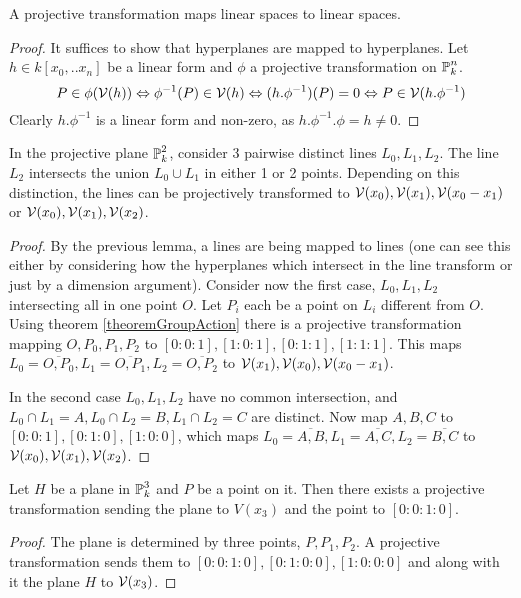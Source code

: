 \begin{lemma} \label{lemmaTransformOfLinearSpaces}
A projective transformation maps linear spaces to linear spaces.
\end{lemma}
\begin{proof}
It suffices to show that hyperplanes are mapped to hyperplanes.
Let $h \in k[x_0,..x_n]$ be a linear form and $\phi$ a projective transformation on $\operatorname{\mathbb P}^n_k$.
\begin{equation}
P \in \phi(\operatorname{\mathcal V}(h)) \Leftrightarrow \phi^{-1}(P) \in \operatorname{\mathcal V}(h) \Leftrightarrow (h.\phi^{-1})(P) = 0 \Leftrightarrow P \in \operatorname{\mathcal V}(h.\phi^{-1})
\end{equation}
Clearly $h.\phi^{-1}$ is a linear form and non-zero, as $h.\phi^{-1}.\phi = h \neq 0$.
\end{proof}


\begin{corollary} \label{corollaryDistinctLines}
In the projective plane $\operatorname{\mathbb P}^2_k$, consider 3 pairwise distinct lines $L_0,L_1,L_2$.
The line $L_2$ intersects the union $L_0 \cup L_1$ in either 1 or 2 points.
Depending on this distinction, the lines can be projectively transformed to $\operatorname{\mathcal V}(x_0),\operatorname{\mathcal V}(x_1),\operatorname{\mathcal V}(x_0-x_1)$ or $\operatorname{\mathcal V}(x_0),\operatorname{\mathcal V}(x_1),\operatorname{\mathcal V}(x_2)$.
\end{corollary}
\begin{proof}
By the previous lemma, a lines are being mapped to lines (one can see this either by considering how the hyperplanes which intersect in the line transform or just by a dimension argument).
Consider now the first case, $L_0,L_1,L_2$ intersecting all in one point $O$.
Let $P_i$ each be a point on $L_i$ different from $O$.
Using theorem \ref{theoremGroupAction} there is a projective transformation mapping $O, P_0,P_1,P_2$ to $[0:0:1],[1:0:1],[0:1:1],[1:1:1]$.
This maps $L_0 = \overline{O,P_0}, L_1 = \overline{O,P_1}, L_2 = \overline{O,P_2}$ to $\operatorname{\mathcal V}(x_1),\operatorname{\mathcal V}(x_0),\operatorname{\mathcal V}(x_0 - x_1)$.

In the second case $L_0,L_1,L_2$ have no common intersection, and $L_0 \cap L_1 = A, L_0 \cap L_2 = B, L_1 \cap L_2 = C$ are distinct.
Now map $A,B,C$ to $[0:0:1],[0:1:0],[1:0:0]$, which maps $L_0 = \overline{A,B}, L_1=\overline{A,C}, L_2=\overline{B,C}$ to $\operatorname{\mathcal V}(x_0),\operatorname{\mathcal V}(x_1),\operatorname{\mathcal V}(x_2)$.
\end{proof}

\begin{corollary} \label{corollaryTransformPlaneWithPointOnIt}
Let $H$ be a plane in $\operatorname{\mathbb P}^3_k$ and $P$ be a point on it.
Then there exists a projective transformation sending the plane to $V(x_3)$ and the point to $[0:0:1:0]$.
\end{corollary}
\begin{proof}
The plane is determined by three points, $P, P_1,P_2$.
A projective transformation sends them to $[0:0:1:0], [0:1:0:0],[1:0:0:0]$ and along with it the plane $H$ to $\operatorname{\mathcal V}(x_3)$.
\end{proof}

